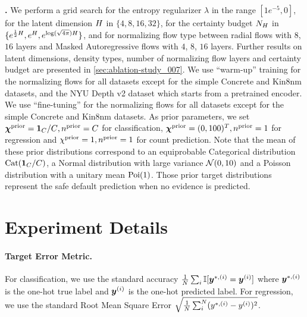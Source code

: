 \textbf{\NatPN{}.} We perform a grid search for the entropy regularizer $\lambda$ in the range $[1e^{-5}, 0]$, for the latent dimension $H$ in $\{4, 8, 16, 32\}$, for the certainty budget $N_H$ in $\{e^{\frac{1}{2}H}, e^{H}, e^{\log(\sqrt{4\pi})H}\}$, and for normalizing flow type between radial flows \citep{radialflow} with $8$, $16$ layers and Masked Autoregressive flows \citep{maf, made} with $4$, $8$, $16$ layers. Further results on latent dimensions, density types, number of normalizing flow layers and certainty budget are presented in \cref{sec:ablation-study_007}. We use ``warm-up'' training for the normalizing flows for all datasets except for the simple Concrete and Kin8nm datasets, and the NYU Depth v2 dataset which starts from a pretrained encoder. We use ``fine-tuning'' for the normalizing flows for all datasets except for the simple Concrete and Kin8nm datasets. As prior parameters, we set ${\bm{\chi}^\text{prior}=\bm{1}_{C}/C}, {n^\text{prior}=C}$ for classification, ${\bm{\chi}^\text{prior}=(0, 100)^T}, n^\text{prior}=1$ for regression and $\chi^\text{prior}=1, n^\text{prior}=1$ for count prediction. Note that the mean of these prior distributions correspond to an equiprobable Categorical distribution $\operatorname{Cat}(\bm{1}_{C}/C)$, a Normal distribution with large variance $\operatorname{\mathcal{N}}(0, 10)$ and a Poisson distribution with a unitary mean $\operatorname{Poi}(1)$. Those prior target distributions represent the safe default prediction when no evidence is predicted.

\section{Experiment Details}
\label{sec:experiment}

\paragraph{Target Error Metric.} For classification, we use the standard accuracy $\frac{1}{N}\sum_{i} \mathbb{I}[\bm{y}^{*,(i)} = \bm{y}^{(i)}]$ where $\bm{y}^{*,(i)}$ is the one-hot true label and $\bm{y}^{(i)}$ is the one-hot predicted label. For regression, we use the standard Root Mean Square Error $\sqrt{\frac{1}{N}\sum_{i}^{N} (y^{*,(i)} - y^{(i)})^2}$.

